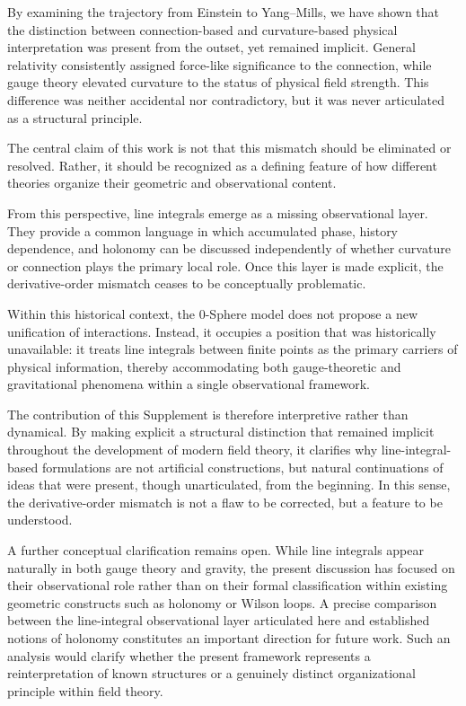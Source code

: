 \documentclass[12pt,letterpaper]{article}
\begin{document}
By examining the trajectory from Einstein to Yang--Mills, we have shown that the distinction between connection-based and curvature-based physical interpretation was present from the outset, yet remained implicit. General relativity consistently assigned force-like significance to the connection, while gauge theory elevated curvature to the status of physical field strength. This difference was neither accidental nor contradictory, but it was never articulated as a structural principle.

The central claim of this work is not that this mismatch should be eliminated or resolved. Rather, it should be recognized as a defining feature of how different theories organize their geometric and observational content.

From this perspective, line integrals emerge as a missing observational layer. They provide a common language in which accumulated phase, history dependence, and holonomy can be discussed independently of whether curvature or connection plays the primary local role. Once this layer is made explicit, the derivative-order mismatch ceases to be conceptually problematic.

Within this historical context, the 0-Sphere model does not propose a new unification of interactions. Instead, it occupies a position that was historically unavailable: it treats line integrals between finite points as the primary carriers of physical information, thereby accommodating both gauge-theoretic and gravitational phenomena within a single observational framework.

The contribution of this Supplement is therefore interpretive rather than dynamical. By making explicit a structural distinction that remained implicit throughout the development of modern field theory, it clarifies why line-integral-based formulations are not artificial constructions, but natural continuations of ideas that were present, though unarticulated, from the beginning. In this sense, the derivative-order mismatch is not a flaw to be corrected, but a feature to be understood.

A further conceptual clarification remains open. While line integrals appear naturally in both gauge theory and gravity, the present discussion has focused on their observational role rather than on their formal classification within existing geometric constructs such as holonomy or Wilson loops. A precise comparison between the line-integral observational layer articulated here and established notions of holonomy constitutes an important direction for future work. Such an analysis would clarify whether the present framework represents a reinterpretation of known structures or a genuinely distinct organizational principle within field theory.
\end{document}

